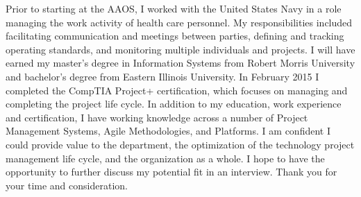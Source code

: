\documentclass[9pt, a4paper]{awesome-cv}
\begin{document}
\begin{cvletter}
Prior to starting at the AAOS, I worked with the United States Navy in a role managing the work activity of health care personnel. My responsibilities included facilitating communication and meetings between parties, defining and tracking operating standards, and monitoring multiple individuals and projects. I will have earned my master’s degree in Information Systems from Robert Morris University and bachelor’s degree from Eastern Illinois University. In February 2015 I completed the CompTIA Project+ certification, which focuses on managing and completing the project life cycle. In addition to my education, work experience and certification, I have working knowledge across a number of Project Management Systems, Agile Methodologies, and Platforms. I am confident I could provide value to the department, the optimization of the technology project management life cycle, and the organization as a whole. I hope to have the opportunity to further discuss my potential fit in an interview. Thank you for your time and consideration.

\end{cvletter}

\makeletterclosing
\end{document}
